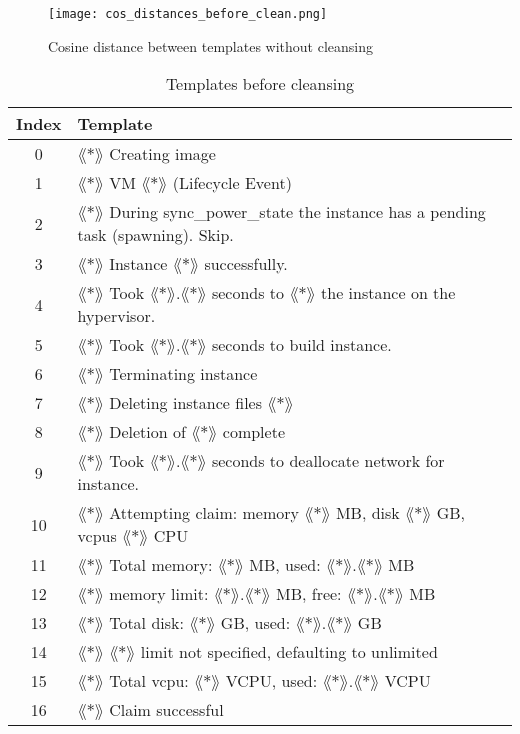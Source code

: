 \begin{figure}[h]
  \centering
  \texttt{[image: cos\_distances\_before\_clean.png]}\\
  \caption{Cosine distance between templates without cleansing}
  \label{fig:cos_distance_before_cleansing}
\end{figure}


\begin{table}[ht]
\begin{small}
\begin{tabular}{ c l } 
\toprule
Index & Template \\
\midrule
0 & $\lang*\rang$ Creating image\\
1 & $\lang*\rang$ VM $\lang*\rang$ (Lifecycle Event)\\
2 & $\lang*\rang$ During sync\_power\_state the instance has a pending task (spawning). Skip.\\
3 & $\lang*\rang$ Instance $\lang*\rang$ successfully.\\
4 & $\lang*\rang$ Took $\lang*\rang$.$\lang*\rang$ seconds to $\lang*\rang$ the instance on the hypervisor.\\
5 & $\lang*\rang$ Took $\lang*\rang$.$\lang*\rang$ seconds to build instance.\\
6 & $\lang*\rang$ Terminating instance\\
7 & $\lang*\rang$ Deleting instance files $\lang*\rang$\\
8 & $\lang*\rang$ Deletion of $\lang*\rang$ complete\\
9 & $\lang*\rang$ Took $\lang*\rang$.$\lang*\rang$ seconds to deallocate network for instance.\\
10 & $\lang*\rang$ Attempting claim: memory $\lang*\rang$ MB, disk $\lang*\rang$ GB, vcpus $\lang*\rang$ CPU\\
11 & $\lang*\rang$ Total memory: $\lang*\rang$ MB, used: $\lang*\rang$.$\lang*\rang$ MB\\
12 & $\lang*\rang$ memory limit: $\lang*\rang$.$\lang*\rang$ MB, free: $\lang*\rang$.$\lang*\rang$ MB\\
13 & $\lang*\rang$ Total disk: $\lang*\rang$ GB, used: $\lang*\rang$.$\lang*\rang$ GB\\
14 & $\lang*\rang$ $\lang*\rang$ limit not specified, defaulting to unlimited\\
15 & $\lang*\rang$ Total vcpu: $\lang*\rang$ VCPU, used: $\lang*\rang$.$\lang*\rang$ VCPU\\
16 & $\lang*\rang$ Claim successful\\
\bottomrule
\end{tabular}
\caption{Templates before cleansing}
\label{tab:templates_before_cleansing}
\end{small}
\end{table}

